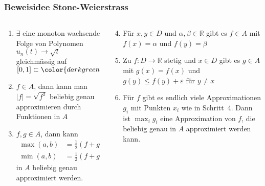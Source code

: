 %
%
%
\bgroup
{}
\begin{frame}[t]
\setlength{\abovedisplayskip}{5pt}
\setlength{\belowdisplayskip}{5pt}
\frametitle{Beweisidee Stone-Weierstrass}
\vspace{-15pt}
\begin{columns}[t]
\begin{column}{0.5\textwidth}
\begin{enumerate}
\item<1->
$\exists$ eine monoton wachsende Folge von Polynomen $u_n(t)\to \sqrt{t}$
gleichmässig auf $[0,1]\subset{\color{darkgreen}\mathbb{R}}$
\item<2->
$f\in A$, dann kann man $|f| = \sqrt{f^2}$ beliebig genau approximieren
durch Funktionen
in $A$
\item<3->
$f,g\in A$, dann kann
\begin{align*}
\max(a,b)&={\textstyle\frac12}(f+g+|f-g|)\\
\min(a,b)&={\textstyle\frac12}(f+g-|f-g|)
\end{align*}
in $A$ beliebig genau approximiert werden.
\end{enumerate}
\end{column}
\begin{column}{0.5\textwidth}
\begin{enumerate}
\setcounter{enumi}{3}
\item<4->
Für $x,y\in D$ und $\alpha,\beta\in\mathbb{R}$ gibt es $f\in A$ mit
$f(x)=\alpha$ und $f(y)=\beta$
\item<5->
Zu
$f\colon D\to\mathbb{R}$ stetig und $x\in D$ gibt es $g\in A$ mit $g(x)=f(x)$
und $g(y) \le f(y)+\varepsilon$ für $y\ne x$
\item<6->
Für $f$ gibt es endlich viele Approximationen $g_i$ mit Punkten $x_i$
wie in Schritt~4.
Dann ist $\max_i g_i$ eine Approximation von $f$, die beliebig genau in
$A$ approximiert werden kann.
\end{enumerate}
\end{column}
\end{columns}

\vspace{10pt}
\end{frame}
\egroup
